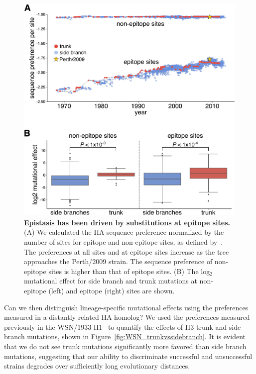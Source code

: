 \documentclass[9pt,twocolumn,twoside]{pnas-new}
\begin{document}
\begin{figure}
\centering
\includegraphics[width=11.4cm]{figs/sequence_preference/sequence_preference.pdf}
\caption{\label{fig:sequence_preference}
{\bf Epistasis has been driven by substitutions at epitope sites.}
(A) We calculated the HA sequence preference normalized by the number of sites for epitope and non-epitope sites, as defined by~\cite{wolf2006long}.
The preferences at all sites and at epitope sites increase as the tree approaches the Perth/2009 strain.
The sequence preference of non-epitope sites is higher than that of epitope sites.
(B) The log$_{2}$ mutational effect for side branch and trunk mutations at non-epitope (left) and epitope (right) sites are shown.
}
\end{figure}

Can we then distinguish lineage-specific mutational effects using the preferences measured in a distantly related HA homolog?
We used the preferences measured previously in the WSN/1933 H1~\citep{doud2016accurate} to quantify the effects of H3 trunk and side branch mutations, shown in Figure~\ref{fig:WSN_trunkvssidebranch}.
It is evident that we do not see trunk mutations significantly more favored than side branch mutations, suggesting that our ability to discriminate successful and unsuccessful strains degrades over sufficiently long evolutionary distances. 
\end{document}
